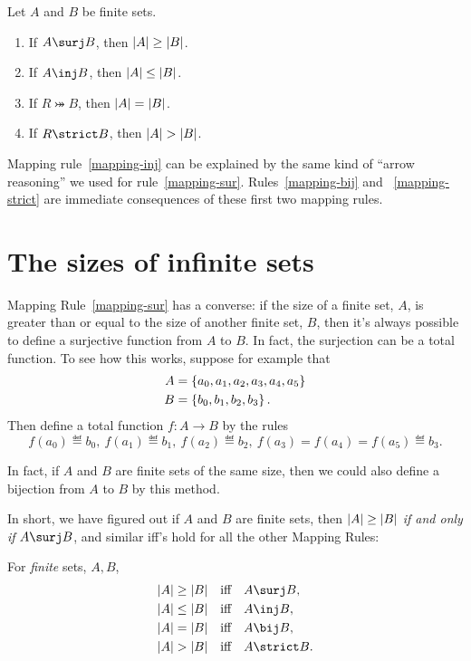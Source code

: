 \begin{lemma}\label{mapruldef}
 \mbox{}
Let $A$ and $B$ be finite sets.

\begin{enumerate}

\item\label{mapping-sur} If $A \surj B$, then $\left|A\right| \geq \left|B\right|$.

\item\label{mapping-inj} If $A \inj B$, then $\left|A\right| \leq \left|B\right|$.

\item\label{mapping-bij} If $R \bij B$, then $\left|A\right| = \left|B\right|$.

\item\label{mapping-strict} If $R \strict B$, then $\left|A\right| > \left|B\right|$.

\end{enumerate}

\end{lemma}

Mapping rule~\ref{mapping-inj} can be explained by the same kind of
``arrow reasoning'' we used for rule~\ref{mapping-sur}.
Rules~\ref{mapping-bij} and ~\ref{mapping-strict} are immediate
consequences of these first two mapping rules.

\section{The sizes of infinite sets}

Mapping Rule~\ref{mapping-sur} has a converse:
if the size of a finite set, $A$, is greater than or equal to the size of
another finite set, $B$, then it's always possible to define a
surjective function from $A$ to $B$.  In fact, the surjection can be a
total function.  To see how this works, suppose for example that
\begin{align*}
A & =\left\{a_0,a_1,a_2,a_3,a_4,a_5\right\}\\
B & =\left\{b_0,b_1,b_2,b_3\right\}.
\end{align*}
Then define a total function $f:A\to B$ by the rules
\[
f(a_0) \eqdef b_0,\  f(a_1) \eqdef b_1,\  f(a_2) \eqdef b_2,\  f(a_3)=
f(a_4)=f(a_5) \eqdef b_3.
\]
\iffalse
\[
f(a_i) \eqdef b_{\min(i,3)},
\]
for $i=0, \dots, 5$.  Since $5 \geq 3$, this $f$ is a surjection.
\fi
In fact, if $A$ and $B$ are finite sets of the same size, then we could also
define a bijection from $A$ to $B$ by this method.

In short, we have figured out if $A$ and $B$ are finite sets, then
$\left|A\right| \geq \left|B\right|$ \emph{if and only if} $A \surj B$, and similar
iff's hold for all the other Mapping Rules:
\begin{lemma}\label{finbig}
For \emph{finite} sets, $A,B$,
\begin{align*}
\card{A} \geq \card{B} & \qiff A \surj B,\\
\card{A} \leq \card{B} & \qiff A \inj B,\\
\card{A} = \card{B} & \qiff A \bij B,\\
\card{A} > \card{B} & \qiff A \strict B.
\end{align*}
\end{lemma}

